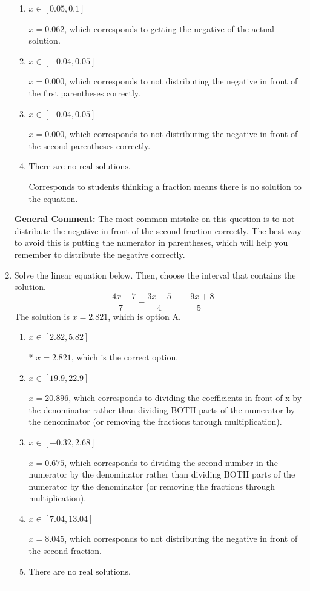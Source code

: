 \documentclass{extbook}[14pt]
\newcommand{\litem}[1]{\item #1

\rule{\textwidth}{0.4pt}}
\begin{document}
\begin{enumerate}
{\begin{enumerate}[label=\Alph*.]
* $x = 0.000$, which is the correct option.
\item \( x \in [0.05, 0.1] \)

$x = 0.062$, which corresponds to getting the negative of the actual solution.
\item \( x \in [-0.04, 0.05] \)

$x = 0.000$, which corresponds to not distributing the negative in front of the first parentheses correctly.
\item \( x \in [-0.04, 0.05] \)

$x = 0.000$, which corresponds to not distributing the negative in front of the second parentheses correctly.
\item \( \text{There are no real solutions.} \)

Corresponds to students thinking a fraction means there is no solution to the equation.
\end{enumerate}

\textbf{General Comment:} The most common mistake on this question is to not distribute the negative in front of the second fraction correctly. The best way to avoid this is putting the numerator in parentheses, which will help you remember to distribute the negative correctly.
}
\litem{
Solve the linear equation below. Then, choose the interval that contains the solution.
\[ \frac{-4x -7}{7} - \frac{3x -5}{4} = \frac{-9x + 8}{5} \]The solution is \( x = 2.821 \), which is option A.\begin{enumerate}[label=\Alph*.]
\item \( x \in [2.82, 5.82] \)

* $x = 2.821$, which is the correct option.
\item \( x \in [19.9, 22.9] \)

 $x = 20.896$, which corresponds to dividing the coefficients in front of x by the denominator rather than dividing BOTH parts of the numerator by the denominator (or removing the fractions through multiplication).
\item \( x \in [-0.32, 2.68] \)

 $x = 0.675$, which corresponds to dividing the second number in the numerator by the denominator rather than dividing BOTH parts of the numerator by the denominator (or removing the fractions through multiplication).
\item \( x \in [7.04, 13.04] \)

 $x = 8.045$, which corresponds to not distributing the negative in front of the second fraction.
\item \( \text{There are no real solutions.} \)


\end{enumerate}}
\end{enumerate}
\end{document}
